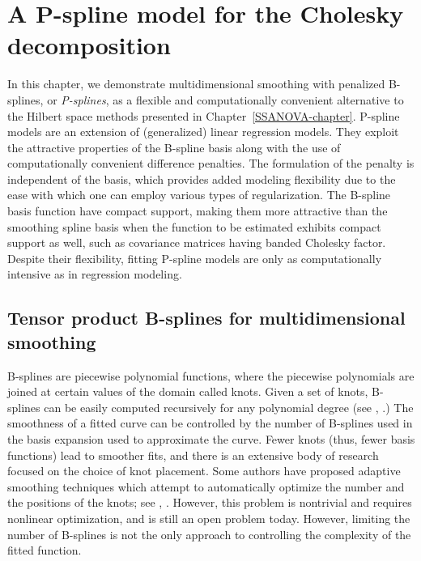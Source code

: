 
\chapter{A P-spline model for the Cholesky decomposition} \label{psplines-chapter}



In this chapter, we demonstrate multidimensional smoothing with penalized B-splines, or \textit{P-splines}, as a flexible and computationally convenient alternative to the Hilbert space methods presented in Chapter~\ref{SSANOVA-chapter}. P-spline models are an extension of (generalized) linear regression models. They exploit the attractive properties of the B-spline basis along with the use of computationally convenient difference penalties. The formulation of the penalty is independent of the basis, which provides added modeling flexibility due to the ease with which one can employ various types of regularization. The B-spline basis function have compact support, making them more attractive than the smoothing spline basis when the function to be estimated exhibits compact support as well, such as covariance matrices having banded Cholesky factor. Despite their flexibility, fitting P-spline models are only as computationally intensive as in regression modeling.  

\section{Tensor product B-splines for multidimensional smoothing}

B-splines are piecewise polynomial functions, where the piecewise polynomials are joined at certain values of the domain called knots. Given a set of knots, B-splines can be easily computed recursively for any polynomial degree (see \cite{de1978practical}, \cite{dierckx1995curve}.) The smoothness of a fitted curve can be controlled by the number of B-splines used in the basis expansion used to approximate the curve. Fewer knots (thus, fewer basis functions) lead to smoother fits, and there is an extensive body of research focused on the choice of knot placement. Some authors have proposed adaptive smoothing techniques which attempt to automatically optimize the number and the positions of the knots; see \cite{friedman1989flexible}, \cite{kooperberg1991study}. However, this problem is nontrivial and requires nonlinear optimization, and is still an open problem today. However, limiting the number of B-splines is not the only approach to controlling the complexity of the fitted function.

